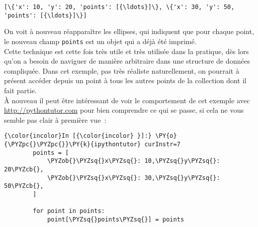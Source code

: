     \begin{Verbatim}[commandchars=\\\{\}]
[\{'x': 10, 'y': 20, 'points': [{\ldots}]\}, \{'x': 30, 'y': 50, 'points': [{\ldots}]\}]

    \end{Verbatim}

    On voit à nouveau réapparaître les ellipses, qui indiquent que pour
chaque point, le nouveau champ \texttt{points} est un objet qui a déjà
été imprimé.\\

Cette technique est cette fois très utile et très utilisée dans la
pratique, dès lors qu'on a besoin de naviguer de manière arbitraire dans
une structure de données compliquée. Dans cet exemple, pas très réaliste
naturellement, on pourrait à présent accéder depuis un point à tous les
autres points de la collection dont il fait partie.\\

    À nouveau il peut être intéressant de voir le comportement de cet
exemple avec\\
\url{http://pythontutor.com} pour bien comprendre ce qui se
passe, si cela ne vous semble pas clair à première vue~:

    \begin{Verbatim}[commandchars=\\\{\}]
{\color{incolor}In [{\color{incolor} }]:} \PY{o}{\PYZpc{}\PYZpc{}}\PY{k}{ipythontutor} curInstr=7
        points = [
            \PYZob{}\PYZsq{}x\PYZsq{}: 10,\PYZsq{}y\PYZsq{}: 20\PYZcb{},
            \PYZob{}\PYZsq{}x\PYZsq{}: 30,\PYZsq{}y\PYZsq{}: 50\PYZcb{},
        ]
        
        for point in points:
            point[\PYZsq{}points\PYZsq{}] = points
\end{Verbatim}